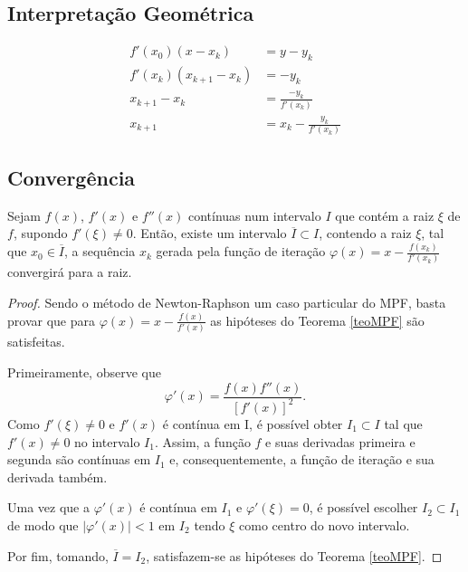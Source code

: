 \subsection{Interpretação Geométrica}
\begin{align*}
    f'(x_0)(x - x_k) &= y - y_k \\
    f'(x_k)(x_{k+1} - x_k) &= -y_k \\
    x_{k+1} - x_k &= \frac{-y_k}{f'(x_k)} \\
    x_{k+1} &= x_k - \frac{y_k}{f'(x_k)}
\end{align*}
\subsection{Convergência}
\begin{teo} \label{teoNR}
    Sejam $f(x)$, $f'(x)$ e $f''(x)$ contínuas num intervalo $I$ que contém a raiz $\xi$ de $f$, supondo $f'(\xi) \neq 0$. Então, existe um intervalo $\overline{I} \subset I$, contendo a raiz $\xi$, tal que $x_0 \in \overline{I}$, a sequência ${x_k}$ gerada pela função de iteração $\varphi(x) = x - \frac{f(x_k)}{f'(x_k)}$ convergirá para a raiz.
\end{teo}
\begin{proof}
    Sendo o método de Newton-Raphson um caso particular do MPF, basta provar que para $\varphi(x) = x - \frac{f(x)}{f'(x)}$ as hipóteses do Teorema \ref{teoMPF} são satisfeitas. 
    
    Primeiramente, observe que 
    \begin{equation} \label{dphiNR}
        \varphi'(x) = \frac{f(x)f''(x)}{[f'(x)]^2}.
    \end{equation}
    Como $f'(\xi) \neq 0$ e $f'(x)$ é contínua em I, é possível obter $I_1 \subset I$ tal que $f'(x) \neq 0$ no intervalo $I_1$. Assim, a função $f$ e suas derivadas primeira e segunda são contínuas em $I_1$ e, consequentemente, a função de iteração e sua derivada também.
    
     Uma vez que a $\varphi'(x)$ é contínua em $I_1$ e $\varphi'(\xi) = 0$, é possível escolher $I_2 \subset I_1$ de modo que $|\varphi'(x)| < 1$ em $I_2$ tendo $\xi$ como centro do novo intervalo.

    Por fim, tomando, $\overline{I} = I_2$, satisfazem-se as hipóteses do Teorema \ref{teoMPF}.
\end{proof}
